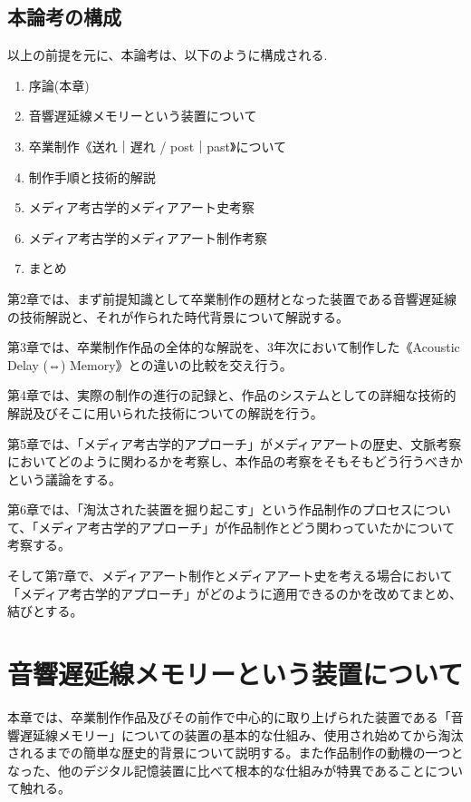\documentclass[a4paper,report]{jsbook}
\begin{document}
\section{本論考の構成}\label{ux672cux8ad6ux8003ux306eux69cbux6210}

以上の前提を元に、本論考は、以下のように構成される.

\begin{enumerate}
\def\labelenumi{\arabic{enumi}.}
\tightlist
\item
  序論(本章)
\item
  音響遅延線メモリーという装置について
\item
  卒業制作《送れ｜遅れ / post｜past》について
\item
  制作手順と技術的解説
\item
  メディア考古学的メディアアート史考察
\item
  メディア考古学的メディアアート制作考察
\item
  まとめ
\end{enumerate}

第2章では、まず前提知識として卒業制作の題材となった装置である音響遅延線の技術解説と、それが作られた時代背景について解説する。

第3章では、卒業制作作品の全体的な解説を、3年次において制作した《Acoustic
Delay (⇔) Memory》との違いの比較を交え行う。

第4章では、実際の制作の進行の記録と、作品のシステムとしての詳細な技術的解説及びそこに用いられた技術についての解説を行う。

第5章では、「メディア考古学的アプローチ」がメディアアートの歴史、文脈考察においてどのように関わるかを考察し、本作品の考察をそもそもどう行うべきかという議論をする。

第6章では、「淘汰された装置を掘り起こす」という作品制作のプロセスについて、「メディア考古学的アプローチ」が作品制作とどう関わっていたかについて考察する。

そして第7章で、メディアアート制作とメディアアート史を考える場合において「メディア考古学的アプローチ」がどのように適用できるのかを改めてまとめ、結びとする。

\chapter{音響遅延線メモリーという装置について}\label{ux97f3ux97ffux9045ux5ef6ux7ddaux30e1ux30e2ux30eaux30fcux3068ux3044ux3046ux88c5ux7f6eux306bux3064ux3044ux3066}

本章では、卒業制作作品及びその前作で中心的に取り上げられた装置である「音響遅延線メモリー」についての装置の基本的な仕組み、使用され始めてから淘汰されるまでの簡単な歴史的背景について説明する。また作品制作の動機の一つとなった、他のデジタル記憶装置に比べて根本的な仕組みが特異であることについて触れる。
\end{document}
